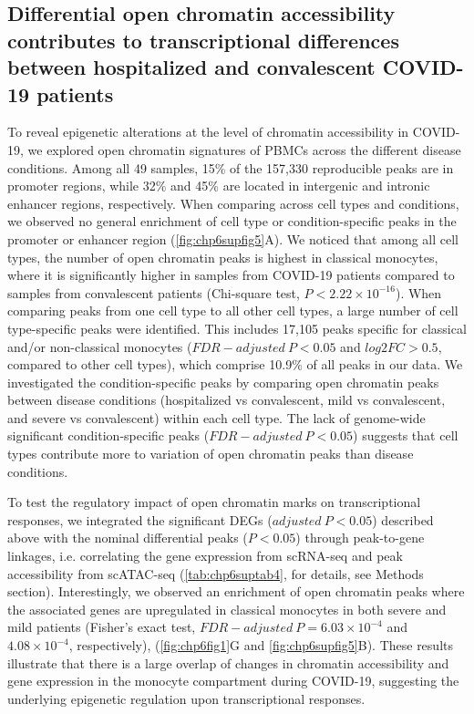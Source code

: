 \documentclass{book}
\begin{document}
\begin{refsection}
\subsection*{Differential open chromatin accessibility contributes to transcriptional differences between hospitalized and convalescent COVID-19 patients}
To reveal epigenetic alterations at the level of chromatin accessibility in COVID-19, we explored open chromatin signatures of PBMCs across the different disease conditions.
Among all 49 samples, 15\% of the 157,330 reproducible peaks are in promoter regions, while 32\% and 45\% are located in intergenic and intronic enhancer regions, respectively.
When comparing across cell types and conditions, we observed no general enrichment of cell type or condition-specific peaks in the promoter or enhancer region (\ref{fig:chp6supfig5}A).
We noticed that among all cell types, the number of open chromatin peaks is highest in classical monocytes, where it is significantly higher in samples from COVID-19 patients compared to samples from convalescent patients (Chi-square test, $P < 2.22 \times 10^{-16}$).
When comparing peaks from one cell type to all other cell types, a large number of cell type-specific peaks were identified.
This includes 17,105 peaks specific for classical and/or non-classical monocytes ($FDR-adjusted~P < 0.05$ and $log2FC > 0.5$, compared to other cell types), which comprise 10.9\% of all peaks in our data.
We investigated the condition-specific peaks by comparing open chromatin peaks between disease conditions (hospitalized vs convalescent, mild vs convalescent, and severe vs convalescent) within each cell type.
The lack of genome-wide significant condition-specific peaks ($FDR-adjusted~P < 0.05$) suggests that cell types contribute more to variation of open chromatin peaks than disease conditions.

To test the regulatory impact of open chromatin marks on transcriptional responses, we integrated the significant DEGs ($adjusted~P < 0.05$) described above with the nominal differential peaks ($P < 0.05$) through peak-to-gene linkages, i.e. correlating the gene expression from scRNA-seq and peak accessibility from scATAC-seq (\ref{tab:chp6suptab4}, for details, see Methods section).
Interestingly, we observed an enrichment of open chromatin peaks where the associated genes are upregulated in classical monocytes in both severe and mild patients (Fisher’s exact test, $FDR-adjusted~P = 6.03 \times 10^{-4}$ and $4.08 \times 10^{-4}$, respectively), (\ref{fig:chp6fig1}G and \ref{fig:chp6supfig5}B).
These results illustrate that there is a large overlap of changes in chromatin accessibility and gene expression in the monocyte compartment during COVID-19, suggesting the underlying epigenetic regulation upon transcriptional responses.


\end{refsection}
\end{document}

